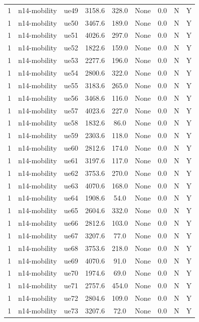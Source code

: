 \begin{table}[ht]
\begin{tabular}{|c|c|c|c|c|c|c|c|c|}
1 & n14-mobility & ue49 & 3158.6 & 328.0 & None & 0.0 & N & Y \\
1 & n14-mobility & ue50 & 3467.6 & 189.0 & None & 0.0 & N & Y \\
1 & n14-mobility & ue51 & 4026.6 & 297.0 & None & 0.0 & N & Y \\
1 & n14-mobility & ue52 & 1822.6 & 159.0 & None & 0.0 & N & Y \\
1 & n14-mobility & ue53 & 2277.6 & 196.0 & None & 0.0 & N & Y \\
1 & n14-mobility & ue54 & 2800.6 & 322.0 & None & 0.0 & N & Y \\
1 & n14-mobility & ue55 & 3183.6 & 265.0 & None & 0.0 & N & Y \\
1 & n14-mobility & ue56 & 3468.6 & 116.0 & None & 0.0 & N & Y \\
1 & n14-mobility & ue57 & 4023.6 & 227.0 & None & 0.0 & N & Y \\
1 & n14-mobility & ue58 & 1832.6 & 86.0 & None & 0.0 & N & Y \\
1 & n14-mobility & ue59 & 2303.6 & 118.0 & None & 0.0 & N & Y \\
1 & n14-mobility & ue60 & 2812.6 & 174.0 & None & 0.0 & N & Y \\
1 & n14-mobility & ue61 & 3197.6 & 117.0 & None & 0.0 & N & Y \\
1 & n14-mobility & ue62 & 3753.6 & 270.0 & None & 0.0 & N & Y \\
1 & n14-mobility & ue63 & 4070.6 & 168.0 & None & 0.0 & N & Y \\
1 & n14-mobility & ue64 & 1908.6 & 54.0 & None & 0.0 & N & Y \\
1 & n14-mobility & ue65 & 2604.6 & 332.0 & None & 0.0 & N & Y \\
1 & n14-mobility & ue66 & 2812.6 & 103.0 & None & 0.0 & N & Y \\
1 & n14-mobility & ue67 & 3207.6 & 77.0 & None & 0.0 & N & Y \\
1 & n14-mobility & ue68 & 3753.6 & 218.0 & None & 0.0 & N & Y \\
1 & n14-mobility & ue69 & 4070.6 & 91.0 & None & 0.0 & N & Y \\
1 & n14-mobility & ue70 & 1974.6 & 69.0 & None & 0.0 & N & Y \\
1 & n14-mobility & ue71 & 2757.6 & 454.0 & None & 0.0 & N & Y \\
1 & n14-mobility & ue72 & 2804.6 & 109.0 & None & 0.0 & N & Y \\
1 & n14-mobility & ue73 & 3207.6 & 72.0 & None & 0.0 & N & Y \\

\end{tabular}
\end{table}
